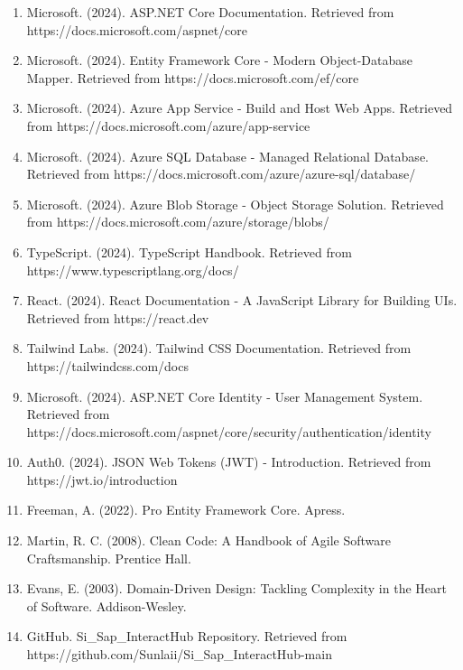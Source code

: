 \documentclass[12pt,a4paper]{report}
\begin{document}
\begin{enumerate}
    \item Microsoft. (2024). ASP.NET Core Documentation. Retrieved from https://docs.microsoft.com/aspnet/core
    
    \item Microsoft. (2024). Entity Framework Core - Modern Object-Database Mapper. Retrieved from https://docs.microsoft.com/ef/core
    
    \item Microsoft. (2024). Azure App Service - Build and Host Web Apps. Retrieved from https://docs.microsoft.com/azure/app-service
    
    \item Microsoft. (2024). Azure SQL Database - Managed Relational Database. Retrieved from https://docs.microsoft.com/azure/azure-sql/database/
    
    \item Microsoft. (2024). Azure Blob Storage - Object Storage Solution. Retrieved from https://docs.microsoft.com/azure/storage/blobs/
    
    \item TypeScript. (2024). TypeScript Handbook. Retrieved from https://www.typescriptlang.org/docs/
    
    \item React. (2024). React Documentation - A JavaScript Library for Building UIs. Retrieved from https://react.dev
    
    \item Tailwind Labs. (2024). Tailwind CSS Documentation. Retrieved from https://tailwindcss.com/docs
    
    \item Microsoft. (2024). ASP.NET Core Identity - User Management System. Retrieved from https://docs.microsoft.com/aspnet/core/security/authentication/identity
    
    \item Auth0. (2024). JSON Web Tokens (JWT) - Introduction. Retrieved from https://jwt.io/introduction
    
    \item Freeman, A. (2022). Pro Entity Framework Core. Apress.
    
    \item Martin, R. C. (2008). Clean Code: A Handbook of Agile Software Craftsmanship. Prentice Hall.
    
    \item Evans, E. (2003). Domain-Driven Design: Tackling Complexity in the Heart of Software. Addison-Wesley.
    
    \item GitHub. Si\_Sap\_InteractHub Repository. Retrieved from https://github.com/Sunlaii/Si\_Sap\_InteractHub-main
\end{enumerate}
\end{document}
